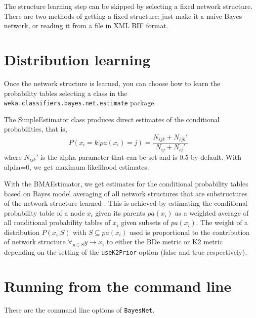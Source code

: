 \documentclass{article}
\begin{document}
The structure learning step can be skipped by selecting a fixed network
structure. There are two methods of getting a fixed structure: just make
it a naive Bayes network, or reading it from a file in XML BIF format.

\begin{center}
\end{center}

\section{Distribution learning\label{sec.estimate}}

Once the network structure is learned, you can choose how to learn the probability
tables selecting a class in the {\tt weka.classifiers.bayes.net.estimate} package.

\begin{center}
\end{center}


The SimpleEstimator class produces direct estimates of the conditional probabilities,
that is, 
$$P(x_i=k|pa(x_i)=j)=\frac{N_{ijk}+N_{ijk}'}{N_{ij}+N_{ij}'}$$ 
where $N_{ijk}'$ is the alpha parameter that can be set and is
$0.5$ by default. With alpha=0, we get maximum likelihood estimates.

\begin{center}
\end{center}

With the BMAEstimator, we get estimates for the conditional probability tables based
on Bayes model averaging of all network structures that are substructures of the
network structure learned \cite{bouck1995}. This is achieved by estimating the
conditional probability table of a node $x_i$ given its parents $pa(x_i)$ as a weighted 
average of all conditional probability tables of $x_i$ given subsets of $pa(x_i)$.
The weight of a distribution $P(x_i|S)$ with $S\subseteq pa(x_i)$ used is proportional
to the contribution of network structure $\forall_{y\in S}y\to x_i$ to either the
BDe metric or K2 metric depending on the setting of the {\tt useK2Prior} option (false
and true respectively).

\begin{center}
\end{center}

\section{Running from the command line}
These are the command line options of {\tt BayesNet}.
\end{document}
